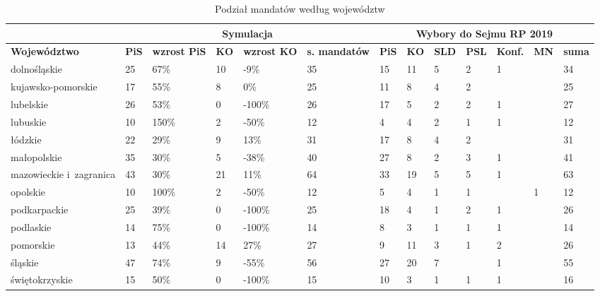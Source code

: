 \begin{table}[H]
\caption{Podział mandatów według województw}
\centering
\begin{adjustbox}{angle=90}
\begin{tabular}{l|lllll|lllllll}
\cline{2-13}
 & \multicolumn{5}{c|}{\textbf{Symulacja}} & \multicolumn{7}{c}{\textbf{Wybory do Sejmu RP 2019}} \\ \hline
\textbf{Województwo} & \textbf{PiS} & \textbf{wzrost PiS} & \textbf{KO} & \textbf{wzrost KO} & \textbf{s. mandatów} & \textbf{PiS} & \textbf{KO} & \textbf{SLD} & \textbf{PSL} & \textbf{Konf.} & \textbf{MN} & \textbf{suma} \\
dolnośląskie & 25 & {\color[HTML]{009901} 67\%} & 10 & {\color[HTML]{FE0000} -9\%} & 35 & 15 & 11 & 5 & 2 & 1 &  & 34 \\
kujawsko-pomorskie & 17 & {\color[HTML]{009901} 55\%} & 8 & {\color[HTML]{FFC702} 0\%} & 25 & 11 & 8 & 4 & 2 &  &  & 25 \\
lubelskie & 26 & {\color[HTML]{009901} 53\%} & 0 & {\color[HTML]{FE0000} -100\%} & 26 & 17 & 5 & 2 & 2 & 1 &  & 27 \\
lubuskie & 10 & {\color[HTML]{009901} 150\%} & 2 & {\color[HTML]{FE0000} -50\%} & 12 & 4 & 4 & 2 & 1 & 1 &  & 12 \\
łódzkie & 22 & {\color[HTML]{009901} 29\%} & 9 & {\color[HTML]{009901} 13\%} & 31 & 17 & 8 & 4 & 2 &  &  & 31 \\
małopolskie & 35 & {\color[HTML]{009901} 30\%} & 5 & {\color[HTML]{FE0000} -38\%} & 40 & 27 & 8 & 2 & 3 & 1 &  & 41 \\
mazowieckie i~zagranica & 43 & {\color[HTML]{009901} 30\%} & 21 & {\color[HTML]{009901} 11\%} & 64 & 33 & 19 & 5 & 5 & 1 &  & 63 \\
opolskie & 10 & {\color[HTML]{009901} 100\%} & 2 & {\color[HTML]{FE0000} -50\%} & 12 & 5 & 4 & 1 & 1 &  & 1 & 12 \\
podkarpackie & 25 & {\color[HTML]{009901} 39\%} & 0 & {\color[HTML]{FE0000} -100\%} & 25 & 18 & 4 & 1 & 2 & 1 &  & 26 \\
podlaskie & 14 & {\color[HTML]{009901} 75\%} & 0 & {\color[HTML]{FE0000} -100\%} & 14 & 8 & 3 & 1 & 1 & 1 &  & 14 \\
pomorskie & 13 & {\color[HTML]{009901} 44\%} & 14 & {\color[HTML]{009901} 27\%} & 27 & 9 & 11 & 3 & 1 & 2 &  & 26 \\
śląskie & 47 & {\color[HTML]{009901} 74\%} & 9 & {\color[HTML]{FE0000} -55\%} & 56 & 27 & 20 & 7 &  & 1 &  & 55 \\
świętokrzyskie & 15 & {\color[HTML]{009901} 50\%} & 0 & {\color[HTML]{FE0000} -100\%} & 15 & 10 & 3 & 1 & 1 & 1 &  & 16 \\

\end{tabular}
\end{adjustbox}
\end{table}
